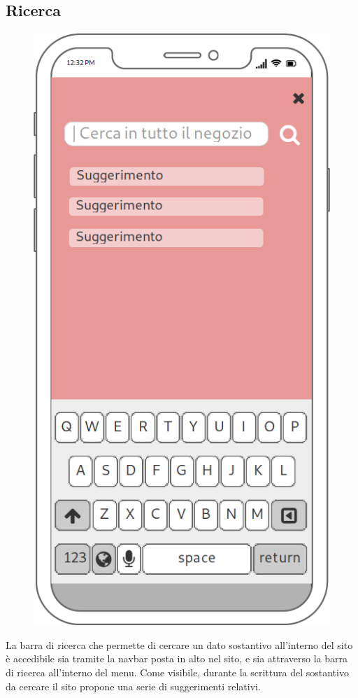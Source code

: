 \documentclass[12pt,a4paper]{report}
\begin{document}
\subsection{Ricerca}
\begin{figure}
\centering
\includegraphics[height=0.4\textheight]{"Project Management Sources/Wireframe/WireFrame Screenshot/Mobile/Ricerca"}
\vspace{-150pt}
\end{figure}
La barra di ricerca che permette di cercare un dato sostantivo all'interno del sito è accedibile sia tramite la navbar posta in alto nel sito, e sia attraverso la barra di ricerca all'interno del menu. Come visibile, durante la scrittura del sostantivo da cercare il sito propone una serie di suggerimenti relativi.
\newpage
\end{document}
